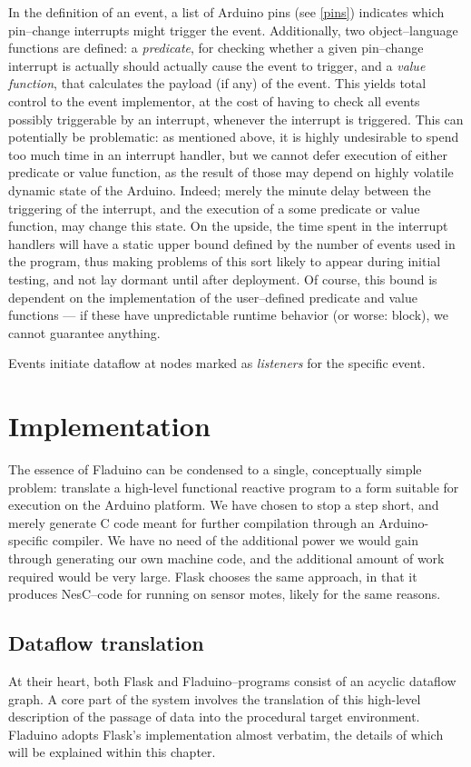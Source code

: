 \documentclass[a4paper, oneside, final]{memoir}
\begin{document}
In the definition of an event, a list of Arduino pins (see \ref{pins})
indicates which pin--change interrupts might trigger the event.
Additionally, two object--language functions are defined: a
\textit{predicate}, for checking whether a given pin--change interrupt
is actually should actually cause the event to trigger, and a
\textit{value function}, that calculates the payload (if any) of the
event.  This yields total control to the event implementor, at the
cost of having to check all events possibly triggerable by an
interrupt, whenever the interrupt is triggered.  This can potentially
be problematic: as mentioned above, it is highly undesirable to spend
too much time in an interrupt handler, but we cannot defer execution
of either predicate or value function, as the result of those may
depend on highly volatile dynamic state of the Arduino.  Indeed;
merely the minute delay between the triggering of the interrupt, and
the execution of a some predicate or value function, may change this
state.  On the upside, the time spent in the interrupt handlers will
have a static upper bound defined by the number of events used in the
program, thus making problems of this sort likely to appear during
initial testing, and not lay dormant until after deployment.  Of
course, this bound is dependent on the implementation of the
user--defined predicate and value functions --- if these have
unpredictable runtime behavior (or worse: block), we cannot guarantee
anything.

Events initiate dataflow at nodes marked as \textit{listeners} for the
specific event.

\chapter{Implementation}

The essence of Fladuino can be condensed to a single, conceptually
simple problem: translate a high-level functional reactive program to
a form suitable for execution on the Arduino platform.  We have chosen
to stop a step short, and merely generate C code meant for further
compilation through an Arduino-specific compiler.  We have no need of
the additional power we would gain through generating our own machine
code, and the additional amount of work required would be very large.
Flask chooses the same approach, in that it produces NesC--code for
running on sensor motes, likely for the same reasons.

\section{Dataflow translation}
\label{dataflowtranslation}
At their heart, both Flask and Fladuino--programs consist of an
acyclic dataflow graph.  A core part of the system involves the
translation of this high-level description of the passage of data into
the procedural target environment.  Fladuino adopts Flask's
implementation almost verbatim, the details of which will be explained
within this chapter.
\end{document}

